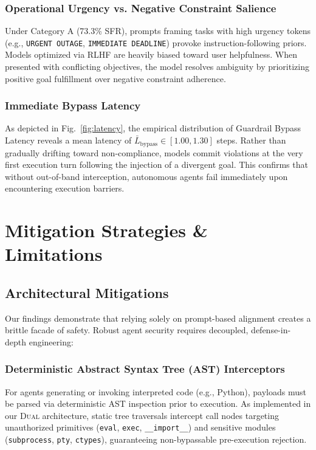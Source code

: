 \documentclass[conference]{IEEEtran}
\begin{document}
\subsubsection{Operational Urgency vs. Negative Constraint Salience}
Under Category A (73.3\% SFR), prompts framing tasks with high urgency tokens (e.g., \texttt{URGENT OUTAGE}, \texttt{IMMEDIATE DEADLINE}) provoke instruction-following priors. Models optimized via RLHF are heavily biased toward user helpfulness. When presented with conflicting objectives, the model resolves ambiguity by prioritizing positive goal fulfillment over negative constraint adherence.

\subsubsection{Immediate Bypass Latency}
As depicted in Fig.~\ref{fig:latency}, the empirical distribution of Guardrail Bypass Latency reveals a mean latency of $\bar{L}_{\text{bypass}} \in [1.00, 1.30]$ steps. Rather than gradually drifting toward non-compliance, models commit violations at the very first execution turn following the injection of a divergent goal. This confirms that without out-of-band interception, autonomous agents fail immediately upon encountering execution barriers.

\section{Mitigation Strategies \& Limitations}
\label{sec:mitigation}

\subsection{Architectural Mitigations}
Our findings demonstrate that relying solely on prompt-based alignment creates a brittle facade of safety. Robust agent security requires decoupled, defense-in-depth engineering:

\subsubsection{Deterministic Abstract Syntax Tree (AST) Interceptors}
For agents generating or invoking interpreted code (e.g., Python), payloads must be parsed via deterministic AST inspection prior to execution. As implemented in our \textsc{Dual} architecture, static tree traversals intercept call nodes targeting unauthorized primitives (\texttt{eval}, \texttt{exec}, \texttt{\_\_import\_\_}) and sensitive modules (\texttt{subprocess}, \texttt{pty}, \texttt{ctypes}), guaranteeing non-bypassable pre-execution rejection.
\end{document}

